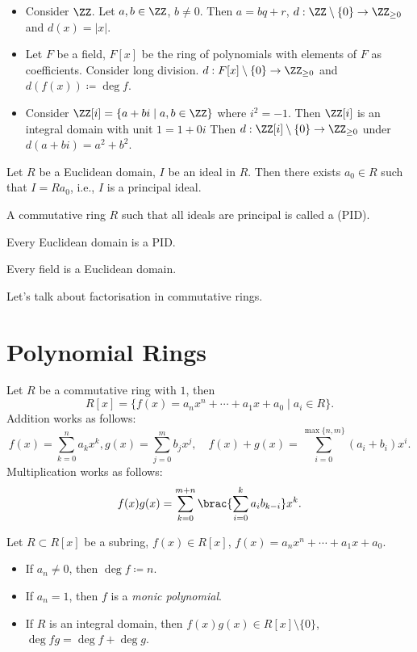 \begin{example}
\begin{itemize}
\item Consider $\ZZ$. Let $a,b\in\ZZ$, $b\neq0$. Then $a=bq+r$, $d:\ZZ\setminus\{0\}\to\ZZ_{\ge0}$ and $d(x)=|x|$.
\item Let $F$ be a field, $F[x]$ be the ring of polynomials with elements of $F$ as coefficients. Consider long division. $d:F[x]\setminus\{0\}\to\ZZ_{\ge0}$ and $d(f(x))\coloneqq\deg f$.
\item Consider $\ZZ[i]=\{a+bi\mid a,b\in\ZZ\}$ where $i^2=-1$. Then $\ZZ[i]$ is an integral domain with unit $1=1+0i$ Then $d:\ZZ[i]\setminus\{0\}\to\ZZ_{\ge0}$ under $d(a+bi)=a^2+b^2$.
\end{itemize}
\end{example}

\begin{theorem}
Let $R$ be a Euclidean domain, $I$ be an ideal in $R$. Then there exists $a_0\in R$ such that $I=Ra_0$, i.e., $I$ is a principal ideal.
\end{theorem}

\begin{definition}
A commutative ring $R$ such that all ideals are principal is called a  (PID).
\end{definition}

\begin{proposition}
Every Euclidean domain is a PID.
\end{proposition}

\begin{proposition}
Every field is a Euclidean domain.
\end{proposition}

Let's talk about factorisation in commutative rings.




\section{Polynomial Rings}
Let $R$ be a commutative ring with $1$, then
\[R[x]=\{f(x)=a_nx^n+\cdots+a_1x+a_0\mid a_i\in R\}.\]
Addition works as follows:
\[f(x)=\sum_{k=0}^{n}a_kx^k, g(x)=\sum_{j=0}^{m}b_jx^j,\quad f(x)+g(x)=\sum_{i=0}^{\max\{n,m\}}(a_i+b_i)x^i.\]
Multiplication works as follows:
\[f(x)g(x)=\sum_{k=0}^{m+n}\brac{\sum_{i=0}^{k}a_ib_{k-i}}x^k.\]

\begin{definition}
Let $R\subset R[x]$ be a subring, $f(x)\in R[x]$, $f(x)=a_nx^n+\cdots+a_1x+a_0$.
\begin{itemize}
\item If $a_n\neq0$, then $\deg f\coloneqq n$.
\item If $a_n=1$, then $f$ is a \emph{monic polynomial}.
\item If $R$ is an integral domain, then $f(x)g(x)\in R[x]\setminus\{0\}$, $\deg fg=\deg f+\deg g$.
\end{itemize}
\end{definition}

